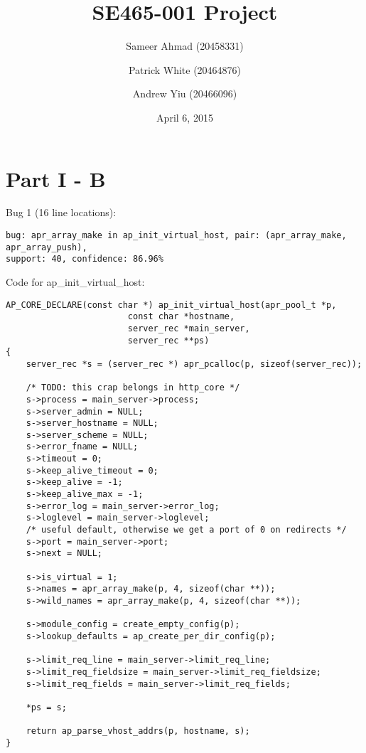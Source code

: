 \documentclass[12pt]{article}
\title{SE465-001 Project}
\author{Sameer Ahmad (20458331) \and Patrick White (20464876) \and Andrew Yiu (20466096)}
\date{April 6, 2015}
\begin{document}
\maketitle

\section{Part I - B}
Bug 1 (16 line locations):
\begin{lstlisting}
bug: apr_array_make in ap_init_virtual_host, pair: (apr_array_make, apr_array_push),
support: 40, confidence: 86.96%
\end{lstlisting}
Code for ap\_init\_virtual\_host:
\begin{lstlisting}
AP_CORE_DECLARE(const char *) ap_init_virtual_host(apr_pool_t *p,
						const char *hostname,
						server_rec *main_server,
						server_rec **ps)
{
	server_rec *s = (server_rec *) apr_pcalloc(p, sizeof(server_rec));
	
	/* TODO: this crap belongs in http_core */
	s->process = main_server->process;
	s->server_admin = NULL;
	s->server_hostname = NULL;
	s->server_scheme = NULL;
	s->error_fname = NULL;
	s->timeout = 0;
	s->keep_alive_timeout = 0;
	s->keep_alive = -1;
	s->keep_alive_max = -1;
	s->error_log = main_server->error_log;
	s->loglevel = main_server->loglevel;
	/* useful default, otherwise we get a port of 0 on redirects */
	s->port = main_server->port;
	s->next = NULL;
	
	s->is_virtual = 1;
	s->names = apr_array_make(p, 4, sizeof(char **));
	s->wild_names = apr_array_make(p, 4, sizeof(char **));
	
	s->module_config = create_empty_config(p);
	s->lookup_defaults = ap_create_per_dir_config(p);
	
	s->limit_req_line = main_server->limit_req_line;
	s->limit_req_fieldsize = main_server->limit_req_fieldsize;
	s->limit_req_fields = main_server->limit_req_fields;
	
	*ps = s;
	
	return ap_parse_vhost_addrs(p, hostname, s);
}
\end{lstlisting}
\end{document}
